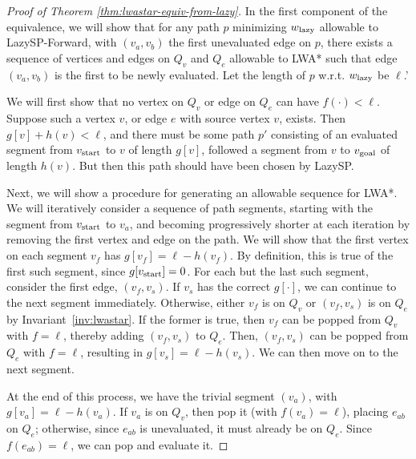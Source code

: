 \begin{proof}[Proof of Theorem \ref{thm:lwastar-equiv-from-lazy}]
In the first component of the equivalence,
we will show that for any path $p$ minimizing $w_{\mbox{\scriptsize lazy}}$
allowable to LazySP-Forward,
with $(v_a, v_b)$ the first unevaluated edge on $p$,
there exists a sequence of vertices and edges on
$Q_v$ and $Q_e$ allowable to LWA*
such that edge $(v_a, v_b)$ is the first to be newly evaluated.
Let the length of $p$ w.r.t. $w_{\mbox{\scriptsize lazy}}$ be $\ell$.'

We will first show that no vertex on $Q_v$ or edge on $Q_e$
can have $f(\cdot) < \ell$.
Suppose such a vertex $v$, or edge $e$ with source vertex $v$,
exists.
Then $g[v] + h(v) < \ell$,
and there must be some path $p'$ consisting of an evaluated segment
from $v_{\mbox{\scriptsize start}}$ to $v$ of length $g[v]$,
followed a segment from $v$ to $v_{\mbox{\scriptsize goal}}$ of length $h(v)$.
But then this path should have been chosen by LazySP.

Next, we will show a procedure for generating an allowable
sequence for LWA*.
We will iteratively consider a sequence of path segments,
starting with the segment from $v_{\mbox{\scriptsize start}}$ to $v_a$,
and becoming progressively shorter at each iteration by removing the
first vertex and edge on the path.
We will show that the first vertex on each segment $v_f$
has $g[v_f] = \ell - h(v_f)$.
By definition,
this is true of the first such segment, since $g[v_{\mbox{\scriptsize start}}] = 0$.
For each but the last such segment,
consider the first edge, $(v_f, v_s)$.
If $v_s$ has the correct $g[\cdot]$,
we can continue to the next segment immediately.
Otherwise,
either $v_f$ is on $Q_v$ or $(v_f, v_s)$ is on $Q_e$ by
Invariant~\ref{inv:lwastar}.
If the former is true,
then $v_f$ can be popped from $Q_v$ with $f = \ell$,
thereby adding $(v_f, v_s)$ to $Q_e$.
Then,
$(v_f, v_s)$ can be popped from $Q_e$ with $f = \ell$,
resulting in $g[v_s] = \ell - h(v_s)$.
We can then move on to the next segment.

At the end of this process,
we have the trivial segment $(v_a)$,
with $g[v_a] = \ell - h(v_a)$.
If $v_a$ is on $Q_v$, then pop it (with $f(v_a) = \ell$),
placing $e_{ab}$ on $Q_e$;
otherwise, since $e_{ab}$ is unevaluated,
it must already be on $Q_e$.
Since $f(e_{ab}) = \ell$, we can pop and evaluate it.
\end{proof}


